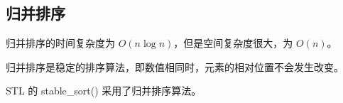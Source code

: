 \subsection{归并排序}
	归并排序的时间复杂度为 $O(n\log n)$，但是空间复杂度很大，为 $O(n)$。
	
	归并排序是稳定的排序算法，即数值相同时，元素的相对位置不会发生改变。
	
	STL 的 stable\_{}sort() 采用了归并排序算法。
	
	
